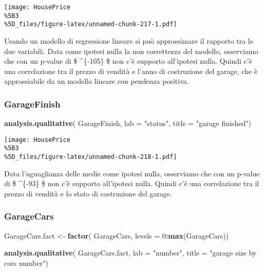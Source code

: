 \documentclass[
]{article}
\newenvironment{Shaded}{\begin{snugshade}}{\end{snugshade}}
\newcommand{\AttributeTok}[1]{\textcolor[rgb]{0.13,0.29,0.53}{#1}}
\newcommand{\DecValTok}[1]{\textcolor[rgb]{0.00,0.00,0.81}{#1}}
\newcommand{\FunctionTok}[1]{\textcolor[rgb]{0.13,0.29,0.53}{\textbf{#1}}}
\newcommand{\NormalTok}[1]{#1}
\newcommand{\OtherTok}[1]{\textcolor[rgb]{0.56,0.35,0.01}{#1}}
\newcommand{\SpecialCharTok}[1]{\textcolor[rgb]{0.81,0.36,0.00}{\textbf{#1}}}
\newcommand{\StringTok}[1]{\textcolor[rgb]{0.31,0.60,0.02}{#1}}
\begin{document}
\texttt{[image: HousePrice\\\%5B3\\\%5D\_files/figure-latex/unnamed-chunk-217-1.pdf]}

Usando un modello di regressione lineare si può approssimare il rapporto
tra le due variabili. Data come ipotesi nulla la non correttezza del
modello, osserviamo che con un p-value di \$ \^{}\{-105\} \$
non c'è supporto all'ipotesi nulla. Quindi c'è una correlazione tra il
prezzo di vendità e l'anno di costruzione del garage, che è
approssiabile da un modello lineare con pendenza positiva.

\subsubsection{GarageFinish}\label{garagefinish-1}

\begin{Shaded}
\begin{Highlighting}[]
\FunctionTok{analysis.qualitative}\NormalTok{(}
\NormalTok{    GarageFinish,}
    \AttributeTok{lab =} \StringTok{"status"}\NormalTok{,}
    \AttributeTok{title =} \StringTok{"garage finished"}\NormalTok{)}
\end{Highlighting}
\end{Shaded}

\texttt{[image: HousePrice\\\%5B3\\\%5D\_files/figure-latex/unnamed-chunk-218-1.pdf]}

Data l'uguaglianza delle medie come ipotesi nulla, osserviamo che con un
p-value di \$ \^{}\{-93\} \$ non c'è supporto all'ipotesi
nulla. Quindi c'è una correlazione tra il prezzo di vendità e lo stato
di costruzione del garage.

\subsubsection{GarageCars}\label{garagecars-1}

\begin{Shaded}
\begin{Highlighting}[]
\NormalTok{GarageCars.fact }\OtherTok{\textless{}{-}} \FunctionTok{factor}\NormalTok{(}
\NormalTok{    GarageCars,}
    \AttributeTok{levels =} \DecValTok{0}\SpecialCharTok{:}\FunctionTok{max}\NormalTok{(GarageCars))}

\FunctionTok{analysis.qualitative}\NormalTok{(}
\NormalTok{    GarageCars.fact,}
    \AttributeTok{lab =} \StringTok{"number"}\NormalTok{,}
    \AttributeTok{title =} \StringTok{"garage size by cars number"}\NormalTok{)}
\end{Highlighting}
\end{Shaded}
\end{document}
